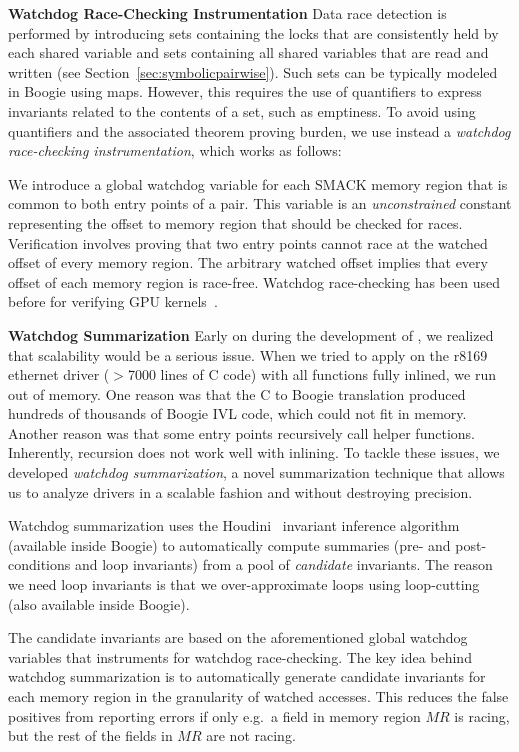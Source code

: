\medskip\noindent\textbf{Watchdog Race-Checking Instrumentation }
%
Data race detection is performed by introducing sets containing the locks that are consistently held by each shared variable and sets containing all shared variables that are read and written (see Section~\ref{sec:symbolicpairwise}). Such sets can be typically modeled in Boogie using maps. However, this requires the use of quantifiers to express invariants related to the contents of a set, such as emptiness. To avoid using quantifiers and the associated theorem proving burden, we use instead a \emph{watchdog race-checking instrumentation}, which works as follows:

We introduce a global watchdog variable for each SMACK memory region that is common to both entry points of a pair. This variable is an \emph{unconstrained} constant representing the offset to memory region that should be checked for races. Verification involves proving that two entry points cannot race at the watched offset of every memory region. The arbitrary watched offset implies that every offset of each memory region is race-free. Watchdog race-checking has been used before for verifying GPU kernels~\cite{bardsley2014engineering}.

\medskip\noindent\textbf{Watchdog Summarization }
%
Early on during the development of \whoop, we realized that scalability would be a serious issue. When we tried to apply \whoop on the r8169 ethernet driver ($>$7000 lines of C code) with all functions fully inlined, we run out of memory. One reason was that the C to Boogie translation produced hundreds of thousands of Boogie IVL code, which could not fit in memory. Another reason was that some entry points recursively call helper functions. Inherently, recursion does not work well with inlining. To tackle these issues, we developed \emph{watchdog summarization}, a novel summarization technique that allows us to analyze drivers in a scalable fashion and without destroying precision.

Watchdog summarization uses the Houdini~\cite{flanagan2001houdini} invariant inference algorithm (available inside Boogie) to automatically compute summaries (pre- and post-conditions and loop invariants) from a pool of \emph{candidate} invariants. The reason we need loop invariants is that we over-approximate loops using loop-cutting (also available inside Boogie).

The candidate invariants are based on the aforementioned global watchdog variables that \whoop instruments for watchdog race-checking. The key idea behind watchdog summarization is to automatically generate candidate invariants for each memory region in the granularity of watched accesses. This reduces the false positives from reporting errors if only e.g.\ a field in memory region $\mathit{MR}$ is racing, but the rest of the fields in $\mathit{MR}$ are not racing.

